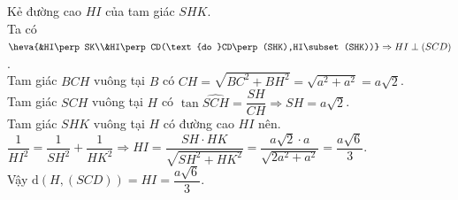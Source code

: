 \begin{ex}
{\begin{itemchoice}
		Kẻ đường cao $HI$ của tam giác $SHK$.\\
		Ta có $\heva{&HI\perp SK\\&HI\perp CD(\text{do }CD\perp (SHK),HI\subset (SHK))}\Rightarrow HI\perp (SCD)$.\\
		Tam giác $BCH$ vuông tại $B$ có
		$CH=\sqrt{BC^2+BH^2}=\sqrt{a^2+a^2}=a\sqrt{2}$.\\
		Tam giác $SCH$ vuông tại $H$ có
		$\tan\widehat{SCH}=\dfrac{SH}{CH}\Rightarrow SH=a\sqrt{2}$.\\
		Tam giác $SHK$ vuông tại $H$ có đường cao $HI$ nên.\\
		$\dfrac{1}{HI^2}=\dfrac{1}{SH^2}+\dfrac{1}{HK^2}\Rightarrow HI=\dfrac{SH\cdot HK}{\sqrt{SH^2+HK^2}}=\dfrac{a\sqrt{2}\cdot a}{\sqrt{2a^2+a^2}}=\dfrac{a\sqrt{6}}{3}$.\\
		Vậy $\mathrm{d}(H,(SCD))=HI=\dfrac{a\sqrt{6}}{3}$.
	\end{itemchoice}}
\end{ex}
